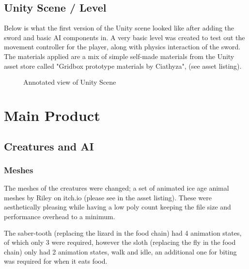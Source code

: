 \documentclass[11pt]{report}
\begin{document}
\subsection{Unity Scene / Level}
Below is what the first version of the Unity scene looked like after adding the sword and basic AI components in. A very basic level was created to test out the movement controller for the player, along with physics interaction of the sword. The materials applied are a mix of simple self-made materials from the Unity asset store called "Gridbox prototype materials by Ciathyza", (see asset listing).

\begin{figure}[H]
    \centering
    \caption{Annotated view of Unity Scene}
\end{figure}

\section{Main Product}
\subsection{Creatures and AI}
\subsubsection{Meshes}
The meshes of the creatures were changed; a set of animated ice age animal meshes by Riley on itch.io (please see in the asset listing). These were aesthetically pleasing while having a low poly count keeping the file size and performance overhead to a minimum. 

The saber-tooth (replacing the lizard in the food chain) had 4 animation states, of which only 3 were required, however the sloth (replacing the fly in the food chain) only had 2 animation states, walk and idle, an additional one for biting was required for when it eats food. 
\end{document}
